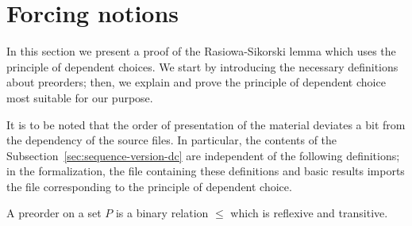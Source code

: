 \section{Forcing notions}\label{sec:forcing-notions}

In this section we present a proof of the Rasiowa-Sikorski lemma which
uses the principle of dependent choices. We start by introducing
the necessary definitions about preorders; then, we explain and prove
the principle of dependent choice most suitable for our purpose.

It is to be noted that the order of presentation of the material
deviates a bit from the dependency of the source  files. In particular,
the contents of the Subsection~\ref{sec:sequence-version-dc} are independent
of the following definitions; in the formalization, the file containing
these definitions and basic results imports the file corresponding to
the principle of dependent choice.


\begin{definition}
  A preorder on a set $P$ is a binary relation ${\leqslant}$ which is
  reflexive and transitive.
\end{definition}

